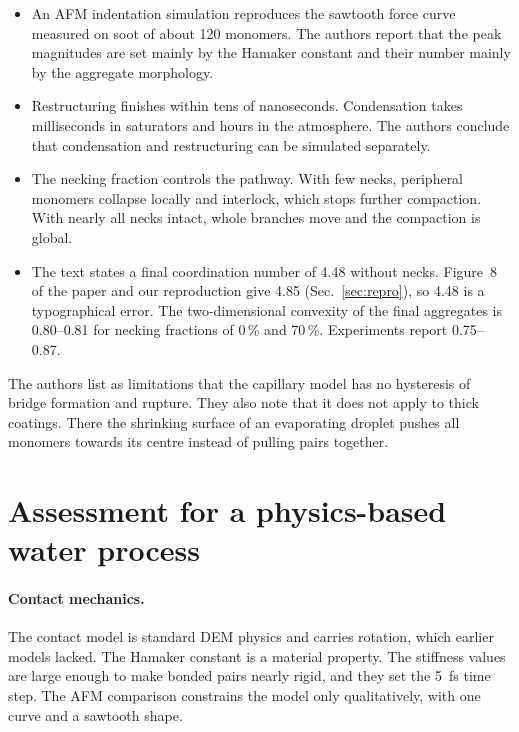 \documentclass[11pt,a4paper]{article}
\begin{document}
\begin{itemize}
  \item An AFM indentation simulation reproduces the sawtooth force curve measured on soot of about 120 monomers.
        The authors report that the peak magnitudes are set mainly by the Hamaker constant and their number mainly by the aggregate morphology.
  \item Restructuring finishes within tens of nanoseconds.
        Condensation takes milliseconds in saturators and hours in the atmosphere.
        The authors conclude that condensation and restructuring can be simulated separately.
  \item The necking fraction controls the pathway.
        With few necks, peripheral monomers collapse locally and interlock, which stops further compaction.
        With nearly all necks intact, whole branches move and the compaction is global.
  \item The text states a final coordination number of 4.48 without necks.
        Figure~8 of the paper and our reproduction give 4.85 (Sec.~\ref{sec:repro}), so 4.48 is a typographical error.
        The two-dimensional convexity of the final aggregates is 0.80--0.81 for necking fractions of 0\,\% and 70\,\%.
        Experiments report 0.75--0.87.
\end{itemize}

The authors list as limitations that the capillary model has no hysteresis of bridge formation and rupture.
They also note that it does not apply to thick coatings.
There the shrinking surface of an evaporating droplet pushes all monomers towards its centre instead of pulling pairs together.

\section{Assessment for a physics-based water process}
\label{sec:assessment}

\paragraph{Contact mechanics.}
The contact model is standard DEM physics and carries rotation, which earlier models lacked.
The Hamaker constant is a material property.
The stiffness values are large enough to make bonded pairs nearly rigid, and they set the \SI{5}{\femto\second} time step.
The AFM comparison constrains the model only qualitatively, with one curve and a sawtooth shape.
\end{document}
